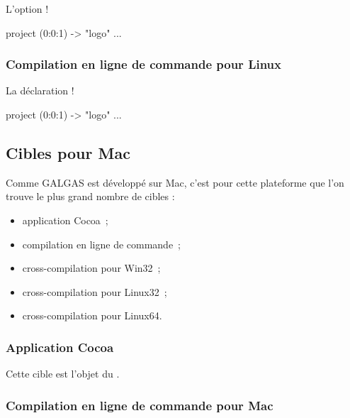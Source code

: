 L'option \ggst!%
\begin{galgas3}
project (0:0:1) -> "logo" {
  ...
}
\end{galgas3}

\subsubsection{Compilation en ligne de commande pour Linux}

La déclaration \ggst!%
\begin{galgas3}
project (0:0:1) -> "logo" {
  ...
}
\end{galgas3}



\subsection{Cibles pour Mac}

Comme GALGAS est développé sur Mac, c'est pour cette plateforme que l'on trouve le plus grand nombre de cibles :
\begin{itemize}
  \item application Cocoa~;
  \item compilation en ligne de commande~;
  \item cross-compilation pour Win32~;
  \item cross-compilation pour Linux32~;
  \item cross-compilation pour Linux64.
\end{itemize}

\subsubsection{Application Cocoa}

Cette cible est l'objet du .

\subsubsection{Compilation en ligne de commande pour Mac}

